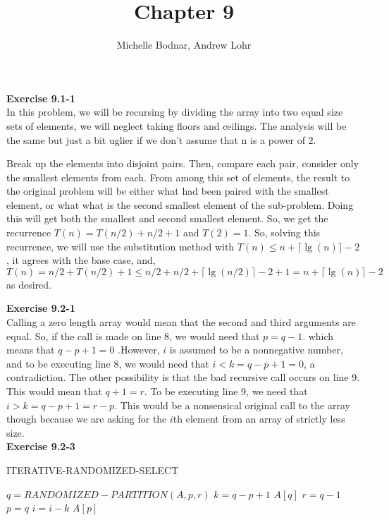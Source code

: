 \documentclass{article}
\title{Chapter 9}
\author{Michelle Bodnar, Andrew Lohr}
\begin{document}
\maketitle

\noindent\textbf{ Exercise 9.1-1} \\
In this problem, we will be recursing by dividing the array into two equal size sets of elements, we will neglect taking floors and ceilings. The analysis will be the same but just a bit uglier if we don't assume that n is a power of 2.

Break up the elements into disjoint pairs. Then, compare each pair, consider only the smallest elements from each. From among this set of elements, the result to the original problem will be either what had been paired with the smallest element, or what what is the second smallest element of the sub-problem. Doing this will get both the smallest and second smallest element. So, we get the recurrence $T(n)  = T(n/2) + n/2 + 1$ and $T(2)= 1$. So, solving this recurrence, we will use the substitution method with $T(n) \le n + \lceil \lg(n) \rceil -2$, it agrees with the base case, and, $T(n) = n/2 + T(n/2) +1 \le n/2 + n/2 + \lceil\lg(n/2)\rceil -2 +1 =  n + \lceil \lg(n) \rceil -2$ as desired.


\noindent\textbf{ Exercise 9.2-1} \\
Calling a zero length array would mean that the second and third arguments are equal. So, if the call is made on line 8, we would need that $p=q-1$. which means that $q-p+1=0$ .However, $i$ is assumed to be a nonnegative number, and to be executing line 8, we would need that $i < k = q-p+1=0$, a contradiction. The other possibility is that the bad recursive call occurs on line 9. This would mean that $q+1=r$. To be executing line 9, we need that $i>k = q-p+1 = r-p$. This would be a nonsensical original call to the array though because we are asking for the $i$th element from an array of strictly less size. \\


\noindent\textbf{ Exercise 9.2-3} \\
\begin{algorithm}
\caption{ ITERATIVE-RANDOMIZED-SELECT}
\begin{algorithmic}
\State $q = RANDOMIZED-PARTITION(A,p,r)$
\State $k=q-p+1$
\State \Return $A[q]$
\EndIf
{}
\State $r = q-1$
\Else
\State $p=q$
\State $i=i-k$
\EndIf
\EndWhile
\State \Return $A[p]$

\end{algorithmic}
\end{algorithm}
\end{document}
